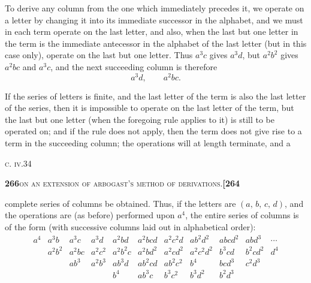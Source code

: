 \documentclass[11pt]{article}
\begin{document}
\medskip

\noindent To derive any column from the one which immediately precedes it, we operate on a letter by changing it into its immediate successor in the alphabet, and we must in each term operate on the last letter, and also, when the last but one letter in the term is the immediate antecessor in the alphabet of the last letter (but in this case only), operate on the last but one letter. Thus $a^3 c$ gives $a^3 d$, but $a^2 b^2$ gives $a^2 b c$ and $a^3 c$, and the next succeeding column is therefore
\[
   a^3 d,\qquad a^2 b c.
\]

\medskip

\noindent If the series of letters is finite, and the last letter of the term is also the last letter of the series, then it is impossible to operate on the last letter of the term, but the last but one letter (when the foregoing rule applies to it) is still to be operated on; and if the rule does not apply, then the term does not give rise to a term in the succeeding column; the operations will at length terminate, and a

\medskip

\noindent\textsc{c. iv.}\hfill 34

\newpage
\setcounter{page}{266}

\noindent\textbf{266}\hfill\textsc{on an extension of arbogast's method of derivations.}\hfill\textbf{[264}

\medskip

\noindent complete series of columns be obtained. Thus, if the letters are $(a,\,b,\,c,\,d)$, and the operations are (as before) performed upon $a^4$, the entire series of columns is of the form (with successive columns laid out in alphabetical order):
\[
\begin{array}{l|l|l|l|l|l|l|l|l|l|l}
   a^4 & a^3 b & a^3 c & a^3 d & a^2 b d & a^2 b c d & a^2 c^2 d & a b^2 d^2 & a b c d^2 & a b d^3 & \cdots\\
       & a^2 b^2 & a^2 b c & a^2 c^2 & a^2 b^2 c & a^2 b d^2 & a^2 c d^2 & a^2 c^2 d^2 & b^3 c d & b^2 c d^2 & d^4\\
       &           & a b^3   & a^2 b^3 & a b^3 d   & a b^2 c d  & a b^2 c^2  & b^4         & b c d^3 & c^2 d^3 &\\
       &           &         &         & b^4        & a b^3 c    & b^3 c^2    & b^3 d^2     & b^2 d^3 &         &\\
\end{array}
\]

\medskip
\end{document}
